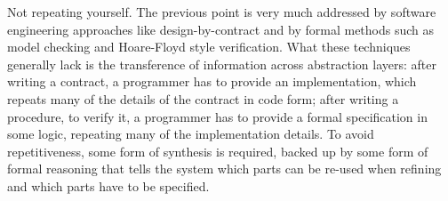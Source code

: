 \begin{paragraph}{Not repeating yourself.}
The previous point is very much addressed by software engineering approaches
like design-by-contract and by formal methods such as model checking and Hoare-Floyd
style verification.
What these techniques generally lack is the transference of information across
abstraction layers:
after writing a contract, a programmer has to provide an implementation,
which repeats many of the details of the contract in code form;
after writing a procedure, to verify it, a programmer has to provide a formal
specification in some logic, repeating many of the implementation details.
To avoid repetitiveness, some form of synthesis is required, backed up by some
form of formal reasoning that tells the system which parts can be re-used when
refining and which parts have to be specified.
\end{paragraph}